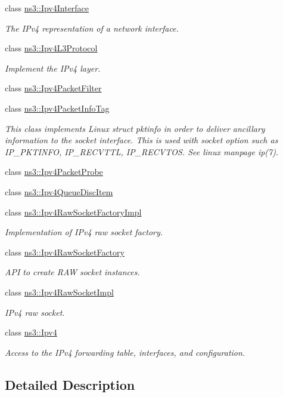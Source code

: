\begin{DoxyCompactItemize}
class \hyperlink{classns3_1_1Ipv4Interface}{ns3\+::\+Ipv4\+Interface}
\begin{DoxyCompactList}\small\item\em The I\+Pv4 representation of a network interface. \end{DoxyCompactList}\item 
class \hyperlink{classns3_1_1Ipv4L3Protocol}{ns3\+::\+Ipv4\+L3\+Protocol}
\begin{DoxyCompactList}\small\item\em Implement the I\+Pv4 layer. \end{DoxyCompactList}\item 
class \hyperlink{classns3_1_1Ipv4PacketFilter}{ns3\+::\+Ipv4\+Packet\+Filter}
\item 
class \hyperlink{classns3_1_1Ipv4PacketInfoTag}{ns3\+::\+Ipv4\+Packet\+Info\+Tag}
\begin{DoxyCompactList}\small\item\em This class implements Linux struct pktinfo in order to deliver ancillary information to the socket interface. This is used with socket option such as I\+P\+\_\+\+P\+K\+T\+I\+N\+FO, I\+P\+\_\+\+R\+E\+C\+V\+T\+TL, I\+P\+\_\+\+R\+E\+C\+V\+T\+OS. See linux manpage ip(7). \end{DoxyCompactList}\item 
class \hyperlink{classns3_1_1Ipv4PacketProbe}{ns3\+::\+Ipv4\+Packet\+Probe}
\item 
class \hyperlink{classns3_1_1Ipv4QueueDiscItem}{ns3\+::\+Ipv4\+Queue\+Disc\+Item}
\item 
class \hyperlink{classns3_1_1Ipv4RawSocketFactoryImpl}{ns3\+::\+Ipv4\+Raw\+Socket\+Factory\+Impl}
\begin{DoxyCompactList}\small\item\em Implementation of I\+Pv4 raw socket factory. \end{DoxyCompactList}\item 
class \hyperlink{classns3_1_1Ipv4RawSocketFactory}{ns3\+::\+Ipv4\+Raw\+Socket\+Factory}
\begin{DoxyCompactList}\small\item\em A\+PI to create R\+AW socket instances. \end{DoxyCompactList}\item 
class \hyperlink{classns3_1_1Ipv4RawSocketImpl}{ns3\+::\+Ipv4\+Raw\+Socket\+Impl}
\begin{DoxyCompactList}\small\item\em I\+Pv4 raw socket. \end{DoxyCompactList}\item 
class \hyperlink{classns3_1_1Ipv4}{ns3\+::\+Ipv4}
\begin{DoxyCompactList}\small\item\em Access to the I\+Pv4 forwarding table, interfaces, and configuration. \end{DoxyCompactList}\end{DoxyCompactItemize}


\subsection{Detailed Description}
